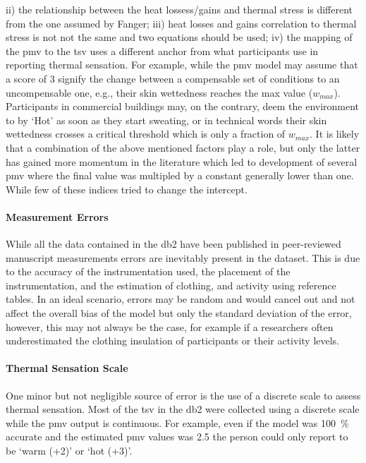 ii) the relationship between the heat lossess/gains and thermal stress is different from the one assumed by Fanger;
iii) heat losses and gains correlation to thermal stress is not not the same and two equations should be used;
iv) the mapping of the \ac{pmv} to the \ac{tsv} uses a different anchor from what participants use in reporting thermal sensation.
For example, while the \ac{pmv} model may assume that a score of 3 signify the change between a compensable set of conditions to an uncompensable one, e.g., their skin wettedness reaches the max value ($w_{max}$).
Participants in commercial buildings may, on the contrary, deem the environment to by `Hot' as soon as they start sweating, or in technical words their skin wettedness crosses a critical threshold which is only a fraction of $w_{max}$.
It is likely that a combination of the above mentioned factors play a role, but only the latter has gained more momentum in the literature which led to development of several \ac{pmv} where the final value was multipled by a constant generally lower than one.
While few of these indices tried to change the intercept.

\paragraph{Measurement Errors}
While all the data contained in the \gls{db2} have been published in peer-reviewed manuscript measurements errors are inevitably present in the dataset.
This is due to the accuracy of the instrumentation used, the placement of the instrumentation, and the estimation of clothing, and activity using reference tables.
In an ideal scenario, errors may be random and would cancel out and not affect the overall bias of the model but only the standard deviation of the error, however, this may not always be the case, for example if a researchers often underestimated the clothing insulation of participants or their activity levels.

\paragraph{Thermal Sensation Scale}
One minor but not negligible source of error is the use of a discrete scale to assess thermal sensation.
Most of the \ac{tsv} in the \gls{db2} were collected using a discrete scale while the \ac{pmv} output is continuous.
For example, even if the model was 100~\% accurate and the estimated \ac{pmv} values was \num{2.5} the person could only report to be `warm (+2)' or `hot (+3)'.

